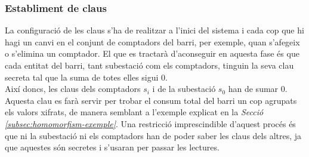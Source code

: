 \documentclass{article}
\begin{document}
\subsubsection{Establiment de claus}\label{section:ks}
La configuració de les claus s'ha de realitzar a l'inici del sistema i cada cop que hi hagi un canvi en el conjunt de comptadors del barri, per exemple, quan s'afegeix o s'elimina un comptador. El que es tractarà d'aconseguir en aquesta fase és que cada entitat del barri, tant subestació com els comptadors, tinguin la seva clau secreta tal que la suma de totes elles sigui 0.
\\
Així doncs, les claus dels comptadors $s_i$ i de la subestació $s_0$ han de sumar $0$. Aquesta clau es farà servir per trobar el consum total del barri un cop agrupats els valors xifrats, de manera semblant a l'exemple explicat en la \textit{Secció \ref{subsec:homomorfism-exemple}}. Una restricció imprescindible d'aquest procés és que ni la subestació ni els comptadors han de poder saber les claus dels altres, ja que aquestes són secretes i s'usaran per passar les lectures.
\end{document}
